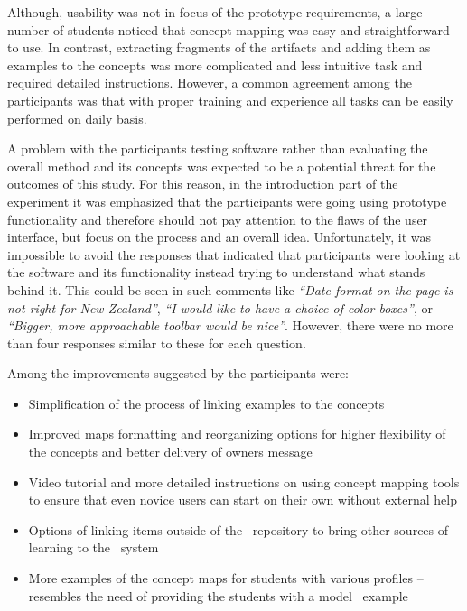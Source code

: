 Although, usability was not in focus of the prototype requirements, a large
number of students noticed that concept mapping was easy and straightforward to
use. In contrast, extracting fragments of the artifacts and adding them as
examples to the concepts was more complicated and less intuitive task and
required detailed instructions. However, a common agreement among the
participants was that with proper training and experience all tasks can be
easily performed on daily basis.

A problem with the participants testing software rather than evaluating the
overall method and its concepts was expected to be a potential threat for
the outcomes of this study. For this reason, in the introduction part of the
experiment it was emphasized that the participants were going using prototype
functionality and therefore should not pay attention to the flaws of the user
interface, but focus on the process and an overall idea. Unfortunately, it was
impossible to avoid the responses that indicated that participants were looking
at the software and its functionality instead trying to understand what stands
behind it. This could be seen in such comments like \textit{``Date format on the
page is not right for New Zealand''}, \textit{``I would like to have a choice of
color boxes''}, or \textit{``Bigger, more approachable toolbar would be nice''}.
However, there were no more than four responses similar to these for each
question.

Among the improvements suggested by the participants were:

\begin{itemize}
  \item Simplification of the process of linking examples to the concepts
  \item Improved maps formatting and reorganizing options for higher
  flexibility of the concepts and better delivery of owners message
  \item Video tutorial and more detailed instructions on using concept mapping
  tools to ensure that even novice users can start on their own without external
  help
  \item Options of linking items outside of the \ep~repository to bring other
  sources of learning to the \ep~system
  \item More examples of the concept maps for students with various profiles --
  resembles the need of providing the students with a model \ep~example
\end{itemize}

